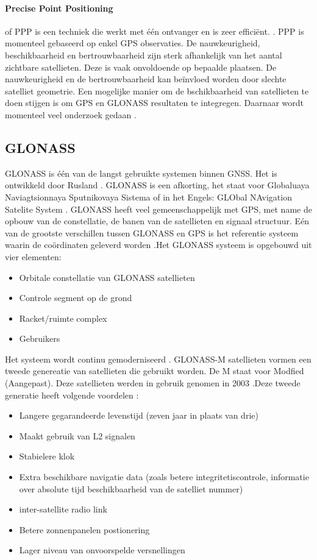 \paragraph{Precise Point Positioning}
of PPP is een techniek die werkt met \'e\'en ontvanger en is zeer effici\"ent. \cite{LBibGNSS4}. PPP is momenteel gebaseerd op enkel GPS observaties. De nauwkeurigheid, beschikbaarheid en bertrouwbaarheid zijn sterk afhankelijk van het aantal zichtbare satellieten. Deze is vaak onvoldoende op bepaalde plaatsen. De nauwkeurigheid en de bertrouwbaarheid kan be\"invloed worden door slechte satelliet geometrie. Een mogelijke manier om de bschikbaarheid van satellieten te doen stijgen is om GPS en GLONASS resultaten te integregen. Daarnaar wordt momenteel veel onderzoek gedaan \cite{LBibPPP}. 

\subsection{GLONASS}
\label{LGLO}
GLONASS is \'e\'en van de langst gebruikte systemen binnen GNSS. Het is ontwikkeld door Rusland \cite{LBibGLONASS2}. GLONASS is een afkorting, het staat voor Globaluaya Naviagtsionnaya Sputnikovaya Sistema of in het Engels: GLObal NAvigation Satelite System  \cite{LBibBeiDou,LBibGNSS8}. GLONASS heeft veel gemeenschappelijk met GPS, met name de opbouw van de constellatie, de banen van de satellieten en signaal structuur. E\'en van de grootste verschillen tussen GLONASS en GPS is het referentie systeem waarin de co\"ordinaten geleverd worden \cite{LBibGNSS8}.Het GLONASS systeem is opgebouwd uit vier elementen:
\begin{itemize}
	\item Orbitale constellatie van GLONASS satellieten
	\item Controle segment op de grond
	\item Racket/ruimte complex
	\item Gebruikers
\end{itemize} \cite{LBibGLONASS2} Het systeem wordt continu gemoderniseerd \cite{LBibGNSS4}. GLONASS-M satellieten vormen een tweede genereatie van satellieten die gebruikt worden\cite{LBibGNSS}. De M staat voor Modfied (Aangepast). Deze satellieten werden in gebruik genomen in 2003 \cite{LBibPPP}.Deze tweede generatie heeft volgende voordelen \cite{LBibGLONASS,LBibPPP}:
\begin{itemize}
	\item Langere gegarandeerde levenstijd (zeven jaar in plaats van drie)
	\item Maakt gebruik van L2 signalen
	\item Stabielere klok
	\item Extra beschikbare navigatie data (zoals betere integritetiscontrole, informatie over absolute tijd beschikbaarheid van de satelliet nummer)
	\item inter-satellite radio link
	\item Betere zonnenpanelen postionering
	\item Lager niveau van onvoorspelde versnellingen
\end{itemize}
